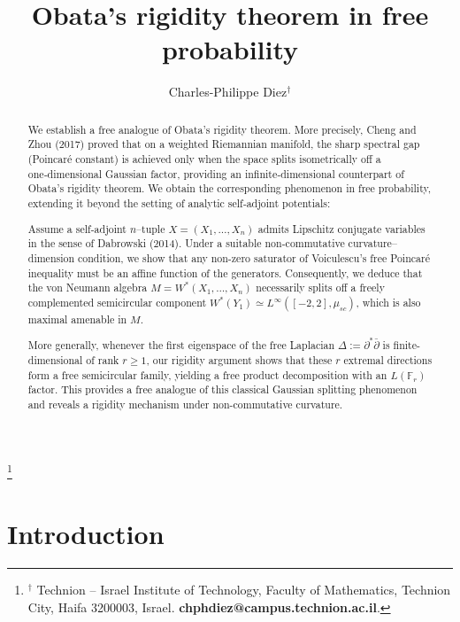 \documentclass[10pt,a4paper,reqno]{amsart}
\begin{document}
\title{Obata's rigidity theorem in free probability}
\author{Charles-Philippe Diez$^{\dagger}$}
\thanks{
$^{\dagger}$ Technion – Israel Institute of Technology, Faculty of Mathematics, Technion City, Haifa
3200003, Israel. \textbf{chphdiez@campus.technion.ac.il}.}









\begin{abstract}
We establish a free analogue of Obata’s rigidity theorem. More precisely, Cheng and Zhou (2017) proved that on a weighted Riemannian manifold, the sharp spectral gap (Poincaré constant) is achieved only when the space splits isometrically off a one‑dimensional Gaussian factor, providing an infinite‑dimensional counterpart of Obata’s rigidity theorem. We obtain the corresponding phenomenon in free probability, extending it beyond the setting of analytic self‑adjoint potentials:

Assume a self-adjoint $n$--tuple $X=(X_1,\ldots,X_n)$ admits Lipschitz conjugate variables in the
sense of Dabrowski (2014).  Under a suitable non-commutative curvature--dimension condition, we
show that any non-zero saturator of Voiculescu’s free Poincar\'e inequality must be an affine
function of the generators.  Consequently, we deduce that the von Neumann algebra $M=W^\ast(X_1,\ldots,X_n)$
necessarily splits off a freely complemented semicircular component $W^*(Y_1)\simeq L^{\infty}([-2,2],\mu_{sc})$, which is also maximal amenable in $M$.

More generally, whenever the first eigenspace of the free Laplacian $\Delta:=\partial^*\bar\partial$ is finite-dimensional of
rank $r\ge 1$, our rigidity argument shows that these $r$ extremal directions form a free
semicircular family, yielding a free product decomposition with an $L(\mathbb{F}_r)$
factor. This provides a free analogue of this classical Gaussian splitting phenomenon and reveals a rigidity mechanism under non-commutative curvature.
\end{abstract}


\maketitle

\section{Introduction}
\end{document}
